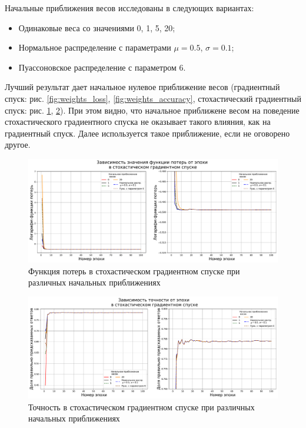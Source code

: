 \documentclass{article}
\begin{document}
\begin{itemize}
Начальные приближения весов исследованы в следующих вариантах: 

\begin{itemize}
  \item Одинаковые веса со значениями 0, 1, 5, 20;
  \item Нормальное распределение с параметрами $\mu=0.5$, $\sigma=0.1$;
  \item Пуассоновское распределение с параметром 6.
\end{itemize}

Лучший результат дает начальное нулевое приближение весов (градиентный спуск: рис. \ref{fig:weights_loss}, \ref{fig:weights_accuracy}, стохастический градиентный спуск: рис. \ref{fig:weights_loss_SGD}, \ref{fig:weights_accuracy_SGD}). При этом видно, что начальное приближене весом на поведение стохастического градиентного спуска не оказывает такого влияния, как на градиентный спуск. Далее используется такое приближение, если не оговорено другое.

\begin{figure}[H]	
    \centering
    \includegraphics[width=15cm]{TASK2 weights loss SGD.pdf}
    \caption{Функция потерь в стохастическом градиентном спуске при различных начальных приближениях}
    \label{fig:weights_loss_SGD}
\end{figure}
\begin{figure}[H]
	\centering
	\includegraphics[width=15cm]{TASK2 weights accuracy SGD.pdf}
	\caption{Точность в стохастическом градиентном спуске при различных начальных приближениях}
	\label{fig:weights_accuracy_SGD}
\end{figure}


\end{itemize}
\end{document}
